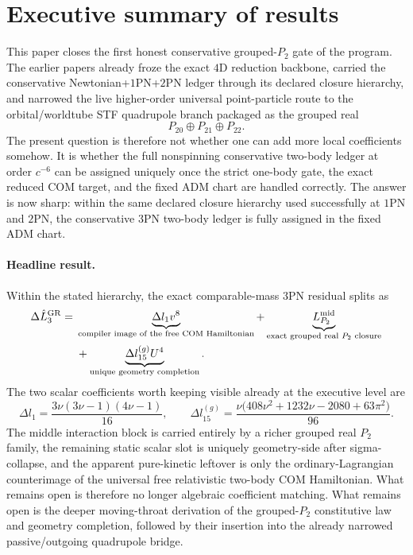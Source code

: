 \documentclass[11pt]{article}
\begin{document}

\section{Executive summary of results}
\label{sec:executive}

This paper closes the first honest conservative grouped-$P_2$ gate of the
program.  The earlier papers already froze the exact $4$D reduction backbone,
carried the conservative Newtonian+$1$PN+$2$PN ledger through its declared
closure hierarchy, and narrowed the live higher-order universal point-particle
route to the orbital/worldtube STF quadrupole branch packaged as the grouped real
\[
P_{20}\oplus P_{21}\oplus P_{22}.
\]
The present question is therefore not whether one can add more local coefficients
somehow.  It is whether the full nonspinning conservative two-body ledger at
order $c^{-6}$ can be assigned uniquely once the strict one-body gate, the exact
reduced COM target, and the fixed ADM chart are handled correctly.  The answer is
now sharp: within the same declared closure hierarchy used successfully at $1$PN
and $2$PN, the conservative $3$PN two-body ledger is fully assigned in the fixed
ADM chart.

\paragraph{Headline result.}
Within the stated hierarchy, the exact comparable-mass $3$PN residual splits as
\[
\begin{aligned}
\Delta \hat L_3^{\rm GR}
=\;&\underbrace{\Delta l_1 v^8}_{\text{compiler image of the free COM Hamiltonian}}
+\underbrace{L_{P_2}^{\rm mid}}_{\text{exact grouped real }P_2\text{ closure}}
\\
&+\underbrace{\Delta l_{15}^{(g)}U^4}_{\text{unique geometry completion}}.
\end{aligned}
\]
The two scalar coefficients worth keeping visible already at the executive level
are
\[
\Delta l_1=\frac{3\nu(3\nu-1)(4\nu-1)}{16},
\qquad
\Delta l_{15}^{(g)}=\frac{\nu\bigl(408\nu^2+1232\nu-2080+63\pi^2\bigr)}{96}.
\]
The middle interaction block is carried entirely by a richer grouped real $P_2$
family, the remaining static scalar slot is uniquely geometry-side after
sigma-collapse, and the apparent pure-kinetic leftover is only the
ordinary-Lagrangian counterimage of the universal free relativistic two-body COM
Hamiltonian.  What remains open is therefore no longer algebraic coefficient
matching.  What remains open is the deeper moving-throat derivation of the
grouped-$P_2$ constitutive law and geometry completion, followed by their
insertion into the already narrowed passive/outgoing quadrupole bridge.
\end{document}

